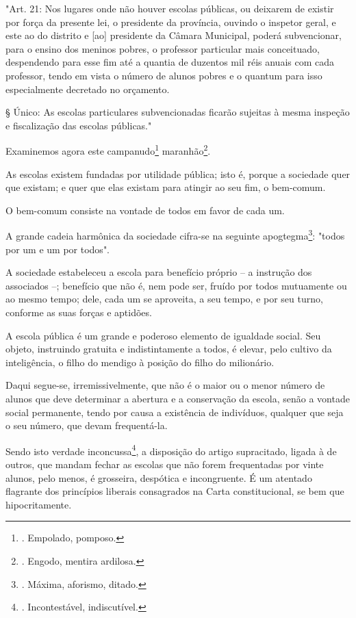 "Art. 21: Nos lugares onde não houver escolas públicas, ou deixarem de
existir por força da presente lei, o presidente da província, ouvindo o
inspetor geral, e este ao do distrito e {[}ao{]} presidente da Câmara
Municipal, poderá subvencionar, para o ensino dos meninos pobres, o
professor particular mais conceituado, despendendo para esse fim até a
quantia de duzentos mil réis anuais com cada professor, tendo em vista o
número de alunos pobres e o quantum para isso especialmente decretado no
orçamento.

§ Único: As escolas particulares subvencionadas ficarão sujeitas à mesma
inspeção e fiscalização das escolas públicas."

Examinemos agora este campanudo\footnote{. Empolado, pomposo.}
maranhão\footnote{. Engodo, mentira ardilosa.}.

As escolas existem fundadas por utilidade pública; isto é, porque a
sociedade quer que existam; e quer que elas existam para atingir ao seu
fim, o bem-comum.

O bem-comum consiste na vontade de todos em favor de cada um.

A grande cadeia harmônica da sociedade cifra-se na seguinte
apogtegma\footnote{. Máxima, aforismo, ditado.}: "todos por um e um por
todos".

A sociedade estabeleceu a escola para benefício próprio -- a instrução
dos associados --; benefício que não é, nem pode ser, fruído por todos
mutuamente ou ao mesmo tempo; dele, cada um se aproveita, a seu tempo, e
por seu turno, conforme as suas forças e aptidões.

A escola pública é um grande e poderoso elemento de igualdade social.
Seu objeto, instruindo gratuita e indistintamente a todos, é elevar,
pelo cultivo da inteligência, o filho do mendigo à posição do filho do
milionário.

Daqui segue-se, irremissivelmente, que não é o maior ou o menor número
de alunos que deve determinar a abertura e a conservação da escola,
senão a vontade social permanente, tendo por causa a existência de
indivíduos, qualquer que seja o seu número, que devam frequentá-la.

Sendo isto verdade inconcussa\footnote{. Incontestável, indiscutível.},
a disposição do artigo supracitado, ligada à de outros, que mandam
fechar as escolas que não forem frequentadas por vinte alunos, pelo
menos, é grosseira, despótica e incongruente. É um atentado flagrante
dos princípios liberais consagrados na Carta constitucional, se bem que
hipocritamente.

